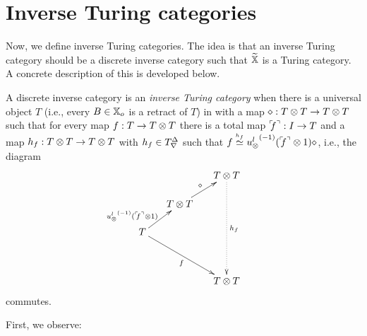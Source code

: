 \section{Inverse Turing categories}
\label{sec:inverse_turing_categories}
Now, we define inverse Turing categories. The idea is that an inverse Turing category should be a discrete
inverse category \X such that $\widetilde{\mathbb{X}}$ is a Turing category. A concrete description of this is
developed below.

\begin{definition}\label{def:inverse_turing_category}
  A discrete inverse category \X is an \emph{inverse Turing category} when there is a universal
  object $T$ (i.e., every $B\in\mathbb{X}_o$ is a retract of $T$) in
  \X with a map $\diamond :T\otimes T \to T\otimes T$ such that for every map $f:T \to T\otimes T$ there is a total map
  ${}^\ulcorner\!\!f^\urcorner: I\to T$ and a map $h_f:T\otimes T \to T\otimes T$ with $h_f \in {T}^{\Delta}_{\nabla}$ such that $f \overset{\scriptscriptstyle h_f}{\simeq}
  {u_{\otimes}^l}^{(-1)}({}^\ulcorner\!\!f^\urcorner\otimes1)\diamond$, i.e., the diagram
  \begin{equation}
    \xymatrix @C=15pt @R=15pt{
      & & T \* T \ar@{.>}[dddd]^{h_f}\\
      &T\*T \ar[ur]^{\diamond} & & \\
      T \ar[ur]^(.3){\inv{\usl}(\iname{f}\*1)} \ar[ddrr]_{f} \\
      & & & \\
      && T\*T
    }\label{dia:inverse-turing-category-code}
  \end{equation}
  commutes.
\end{definition}

First, we observe:


